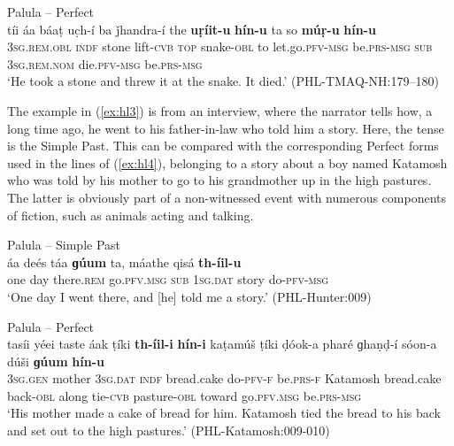 \documentclass[output=paper]{langsci/langscibook}
\begin{document}
\begin{exe}
	\ex\label{ex:hl2} Palula -- Perfect\\
	\gll tíi áa báaṭ uc̣h-í ba ǰhandra-í the \textbf{uṛíit-u} \textbf{hín-u} ta so \textbf{múṛ-u} \textbf{hín-u}\\
	{3\textsc{sg}.\textsc{rem}.\textsc{obl}} {\textsc{indf}} stone lift-\textsc{cvb} \textsc{top} snake-\textsc{obl} to {let.go.\textsc{pfv}-\textsc{msg}} {be.\textsc{prs}-\textsc{msg}} \textsc{sub} {3\textsc{sg}.\textsc{rem}.\textsc{nom}} {die.\textsc{pfv}-\textsc{msg}} {be.\textsc{prs}-\textsc{msg}} \\
	‘He took a stone and threw it at the snake. It died.’ (PHL-TMAQ-NH:179–180)
\end{exe}

The example in ‎(\ref{ex:hl3}) is from an interview, where the narrator tells how, a long time ago, he went to his father-in-law who told him a story. Here, the tense is the Simple Past. This can be compared with the corresponding Perfect forms used in the lines of ‎(\ref{ex:hl4}), belonging to a story about a boy named Katamosh who was told by his mother to go to his grandmother up in the high pastures. The latter is obviously part of a non-witnessed event with numerous components of fiction, such as animals acting and talking.

\begin{exe}
	\ex Palula -- Simple Past \label{ex:hl3}\\
	\gll áa deés táa \textbf{ɡúum} ta, máathe qisá \textbf{th-íil-u}\\
	one day there.\textsc{rem} go.\textsc{pfv}.\textsc{msg} \textsc{sub} 1\textsc{sg}.\textsc{dat} story do-\textsc{pfv}-\textsc{msg} \\
	\trans ‘One day I went there, and [he] told me a story.’ (PHL-Hunter:009)
\end{exe}

\begin{exe}
	\ex Palula -- Perfect \label{ex:hl4}\\
	\gll tasíi yéei taste áak ṭíki \textbf{th-íil-i} \textbf{hín-i} kaṭamúš ṭíki ḍóok-a pharé ɡhaṇḍ-í sóon-a dúši \textbf{ɡúum} \textbf{hín-u}\\
	3\textsc{sg}.\textsc{gen} mother 3\textsc{sg}.\textsc{dat} \textsc{indf} bread.cake do-\textsc{pfv}-\textsc{f} be.\textsc{prs}-\textsc{f} Katamosh bread.cake back-\textsc{obl} along tie-\textsc{cvb} pasture-\textsc{obl} toward go.\textsc{pfv}.\textsc{msg} be.\textsc{prs}-\textsc{msg}\\
	\trans ‘His mother made a cake of bread for him. Katamosh tied the bread to his back and set out to the high pastures.’ (PHL-Katamosh:009-010)
\end{exe}
\end{document}
